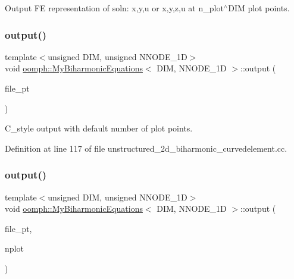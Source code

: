 Output FE representation of soln\+: x,y,u or x,y,z,u at n\+\_\+plot$^\wedge$\+D\+IM plot points. 

\mbox{\label{classoomph_1_1MyBiharmonicEquations_a2ee8f210f50cf3b43f2b31b5e16b704f}} 
\subsubsection{\texorpdfstring{output()}{output()}\hspace{0.1cm}{\footnotesize\ttfamily [6/8]}}
{\footnotesize\ttfamily template$<$unsigned D\+IM, unsigned N\+N\+O\+D\+E\+\_\+1D$>$ \\
void \hyperlink{classoomph_1_1MyBiharmonicEquations}{oomph\+::\+My\+Biharmonic\+Equations}$<$ D\+IM, N\+N\+O\+D\+E\+\_\+1D $>$\+::output (\begin{DoxyParamCaption}\item[{F\+I\+LE $\ast$}]{file\+\_\+pt }\end{DoxyParamCaption})\hspace{0.3cm}{\ttfamily [inline]}}



C\+\_\+style output with default number of plot points. 



Definition at line 117 of file unstructured\+\_\+2d\+\_\+biharmonic\+\_\+curvedelement.\+cc.

\mbox{\label{classoomph_1_1MyBiharmonicEquations_a898e272a1af66eacb3ebe5ac2fbe7749}} 
\subsubsection{\texorpdfstring{output()}{output()}\hspace{0.1cm}{\footnotesize\ttfamily [7/8]}}
{\footnotesize\ttfamily template$<$unsigned D\+IM, unsigned N\+N\+O\+D\+E\+\_\+1D$>$ \\
void \hyperlink{classoomph_1_1MyBiharmonicEquations}{oomph\+::\+My\+Biharmonic\+Equations}$<$ D\+IM, N\+N\+O\+D\+E\+\_\+1D $>$\+::output (\begin{DoxyParamCaption}\item[{F\+I\+LE $\ast$}]{file\+\_\+pt,  }\item[{const unsigned \&}]{nplot }\end{DoxyParamCaption})}



